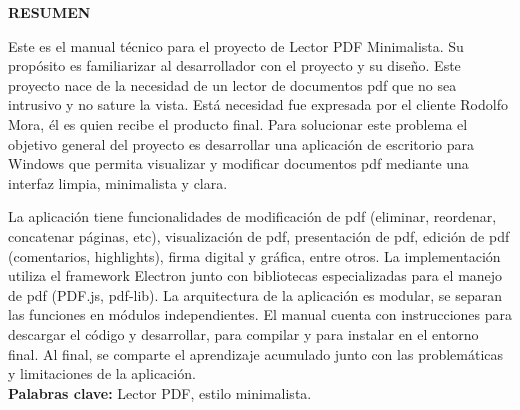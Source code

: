 \begin{center}
\thispagestyle{empty}
\vspace{2cm}
\LARGE{\textbf{RESUMEN}}\\[1.0cm]
\end{center}
\thispagestyle{empty}
Este es el manual técnico para el proyecto de Lector PDF Minimalista. Su propósito es familiarizar al desarrollador con el proyecto y su diseño. Este proyecto nace de la necesidad de un lector de documentos pdf que no sea intrusivo y no sature la vista. Está necesidad fue expresada por el cliente Rodolfo Mora, él es quien recibe el producto final. Para solucionar este problema el objetivo general del proyecto es desarrollar una aplicación de escritorio para Windows que permita visualizar y modificar documentos pdf mediante una interfaz limpia, minimalista y clara.

La aplicación tiene funcionalidades de modificación de pdf (eliminar, reordenar, concatenar páginas, etc), visualización de pdf, presentación de pdf, edición de pdf (comentarios, highlights), firma digital y gráfica, entre otros. La implementación utiliza el framework Electron junto con bibliotecas especializadas para el manejo de pdf (PDF.js, pdf-lib). La arquitectura de la aplicación es modular, se separan las funciones en módulos independientes. El manual cuenta con instrucciones para descargar el código y desarrollar, para compilar y para instalar en el entorno final. Al final, se comparte el aprendizaje acumulado junto con las problemáticas y limitaciones de la aplicación.\\
\textbf{Palabras clave: }Lector PDF, estilo minimalista.